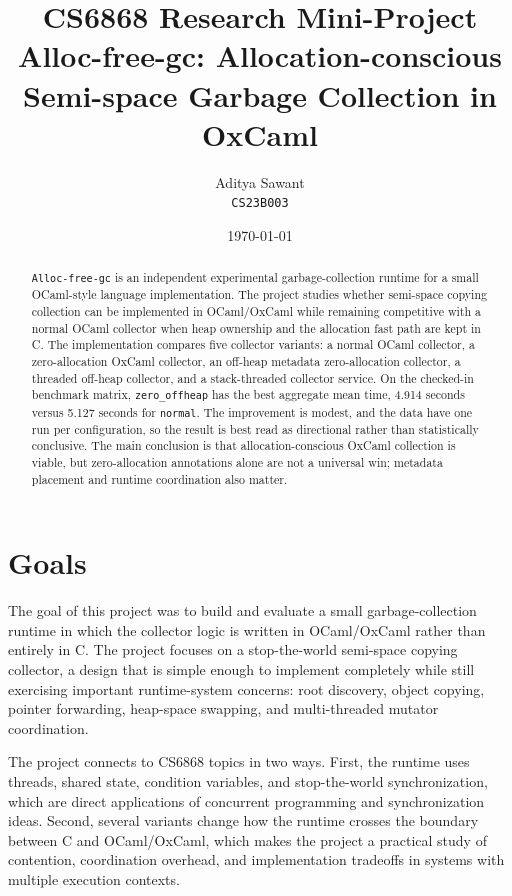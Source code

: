 \documentclass[11pt,a4paper]{article}
\title{%
  \textbf{CS6868 Research Mini-Project} \\[0.3em]
  \Large Alloc-free-gc: Allocation-conscious Semi-space Garbage Collection in OxCaml%
}
\author{%
  Aditya Sawant \\ \texttt{CS23B003}
}
\date{\today}
\begin{document}
\maketitle

\begin{abstract}
\texttt{Alloc-free-gc} is an independent experimental garbage-collection
runtime for a small OCaml-style language implementation. The project studies
whether semi-space copying collection can be implemented in OCaml/OxCaml while
remaining competitive with a normal OCaml collector when heap ownership and the
allocation fast path are kept in C. The implementation compares five collector
variants: a normal OCaml collector, a zero-allocation OxCaml collector, an
off-heap metadata zero-allocation collector, a threaded off-heap collector, and
a stack-threaded collector service. On the checked-in benchmark matrix,
\texttt{zero\_offheap} has the best aggregate mean time, 4.914 seconds versus
5.127 seconds for \texttt{normal}. The improvement is modest, and the data have
one run per configuration, so the result is best read as directional rather
than statistically conclusive. The main conclusion is that allocation-conscious
OxCaml collection is viable, but zero-allocation annotations alone are not a
universal win; metadata placement and runtime coordination also matter.
\end{abstract}

\section{Goals}
\label{sec:goals}

The goal of this project was to build and evaluate a small garbage-collection
runtime in which the collector logic is written in OCaml/OxCaml rather than
entirely in C. The project focuses on a stop-the-world semi-space copying
collector, a design that is simple enough to implement completely while still
exercising important runtime-system concerns: root discovery, object copying,
pointer forwarding, heap-space swapping, and multi-threaded mutator
coordination.

The project connects to CS6868 topics in two ways. First, the runtime uses
threads, shared state, condition variables, and stop-the-world synchronization,
which are direct applications of concurrent programming and synchronization
ideas. Second, several variants change how the runtime crosses the boundary
between C and OCaml/OxCaml, which makes the project a practical study of
contention, coordination overhead, and implementation tradeoffs in systems with
multiple execution contexts.
\end{document}
